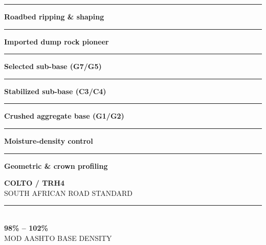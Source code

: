 \documentclass[a4paper,11pt]{article}
\begin{document}
\begin{minipage}[t]{0.34\textwidth}
    \vspace{0pt}
    \begin{tcolorbox}[
        enhanced, colback=mhoffwhite, colframe=mhnavy, boxrule=1pt, arc=4pt,
        title={\bfseries\color{white}\faRoad\ Layerworks Scope of Work},
        colbacktitle=mhnavy, left=7pt, right=7pt, top=6pt, bottom=6pt,
        drop shadow=black!6
    ]
        \fontsize{8.1pt}{11.6pt}\selectfont
        \textcolor{mhnavy}{\rule{4pt}{4pt}}\hspace{4pt}\textbf{Roadbed ripping \& shaping}\\
        \textcolor{mhnavy}{\rule{4pt}{4pt}}\hspace{4pt}\textbf{Imported dump rock pioneer}\\
        \textcolor{mhnavy}{\rule{4pt}{4pt}}\hspace{4pt}\textbf{Selected sub-base (G7/G5)}\\
        \textcolor{mhnavy}{\rule{4pt}{4pt}}\hspace{4pt}\textbf{Stabilized sub-base (C3/C4)}\\
        \textcolor{mhnavy}{\rule{4pt}{4pt}}\hspace{4pt}\textbf{Crushed aggregate base (G1/G2)}\\
        \textcolor{mhnavy}{\rule{4pt}{4pt}}\hspace{4pt}\textbf{Moisture-density control}\\
        \textcolor{mhnavy}{\rule{4pt}{4pt}}\hspace{4pt}\textbf{Geometric \& crown profiling}
    \end{tcolorbox}

    \vspace{0.20cm}

    \begin{tcolorbox}[
        enhanced, colback=white, colframe=mhlightgray, boxrule=0.8pt, arc=4pt,
        left=6pt, right=6pt, top=6pt, bottom=6pt, halign=center,
        drop shadow=black!4
    ]
        {\fontsize{18pt}{20pt}\selectfont\bfseries\color{mhblue}COLTO / TRH4}\\[1pt]
        {\fontsize{7.4pt}{9pt}\selectfont\color{mhtextmuted}\MakeUppercase{South African Road Standard}}\\[4pt]
        \textcolor{mhlightgray}{\rule{3.2cm}{0.6pt}}\\[4pt]
        {\fontsize{13pt}{15pt}\selectfont\bfseries\color{mhnavy}98\% -- 102\%}\\[1pt]
        {\fontsize{7.2pt}{9pt}\selectfont\color{mhtextmuted}\MakeUppercase{Mod AASHTO Base Density}}
    \end{tcolorbox}
\end{minipage}
\end{document}
